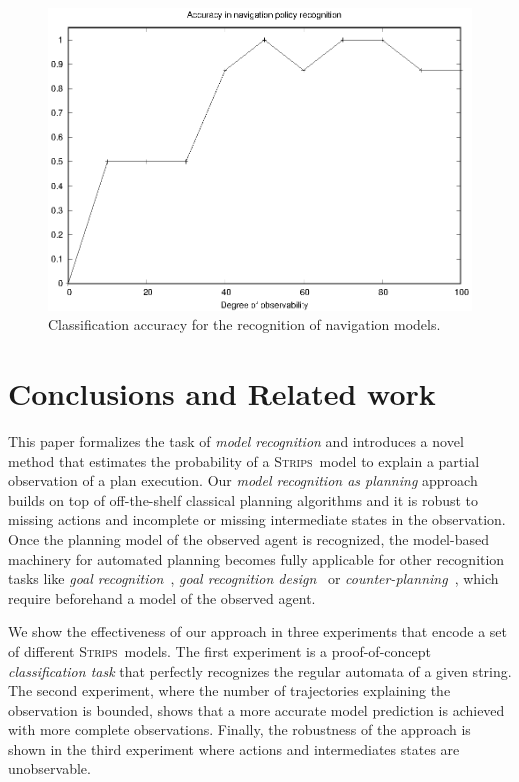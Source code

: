 \documentclass[letterpaper]{article} %
\newcommand{\strips}{\textsc{Strips}}     %
\begin{document}
\begin{figure}
	\centering
	\includegraphics[width=0.9\linewidth]{figures/navigation.eps}
	\caption{Classification accuracy for the recognition of navigation models.}
	\label{fig:navigation_acc}
\end{figure}



\section{Conclusions and Related work}
\label{sec:related}


This paper formalizes the task of {\em model recognition} and introduces a novel method that estimates the probability of a \strips\ model to explain a partial observation of a plan execution. Our {\em model recognition as planning} approach builds on top of off-the-shelf classical planning algorithms and it is robust to missing actions and incomplete or missing intermediate states in the observation. Once the planning model of the observed agent is recognized, the model-based machinery for automated planning becomes fully applicable for other recognition tasks like {\em goal recognition}~\cite{RamirezG10,ramirez2012plan}, {\em goal recognition design}~\cite{KerenGK14} or {\em counter-planning}~\cite{PozancoEFB18}, which require beforehand a model of the observed agent.

We show the effectiveness of our approach in three experiments that encode a set of different \strips\ models.
The first experiment is a proof-of-concept \emph{classification task} that perfectly recognizes the regular automata of a given string. The second experiment, where the number of trajectories explaining the observation is bounded, shows that a more accurate model prediction is achieved with more complete observations. Finally, the robustness of the approach is shown in the third experiment where actions and intermediates states are unobservable. 
\end{document}
